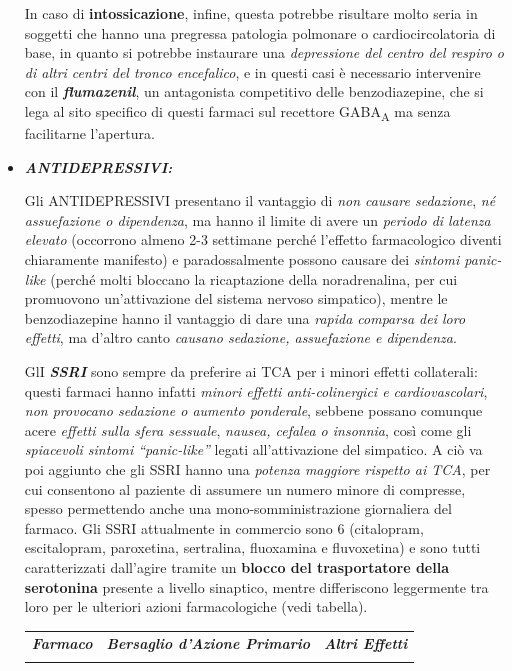 \begin{itemize}
In
caso di \textbf{intossicazione}, infine, questa potrebbe risultare molto
seria in soggetti che hanno una pregressa patologia polmonare o
cardiocircolatoria di base, in quanto si potrebbe instaurare una
\emph{depressione del centro del respiro o di altri centri del tronco
encefalico}, e in questi casi è necessario intervenire con il
\textbf{\emph{flumazenil}}, un antagonista competitivo delle
benzodiazepine, che si lega al sito specifico di questi farmaci sul
recettore GABA\textsubscript{A} ma senza facilitarne l'apertura.


\item
  \textbf{\emph{ANTIDEPRESSIVI:}}

Gli ANTIDEPRESSIVI presentano il vantaggio di \emph{non causare
sedazione}, \emph{né assuefazione o dipendenza}, ma hanno il limite di
avere un \emph{periodo di latenza elevato} (occorrono almeno 2-3
settimane perché l'effetto farmacologico diventi chiaramente manifesto)
e paradossalmente possono causare dei \emph{sintomi panic-like} (perché
molti bloccano la ricaptazione della noradrenalina, per cui promuovono
un'attivazione del sistema nervoso simpatico), mentre le benzodiazepine
hanno il vantaggio di dare una \emph{rapida comparsa dei loro effetti},
ma d'altro canto \emph{causano sedazione, assuefazione e dipendenza}.

GlI \emph{\textbf{SSRI}} sono sempre da preferire ai TCA per i minori
effetti collaterali: questi farmaci hanno infatti \emph{minori effetti
anti-colinergici e cardiovascolari}, \emph{non provocano sedazione o
aumento ponderale}, sebbene possano comunque acere \emph{effetti sulla
sfera sessuale}, \emph{nausea, cefalea o insonnia}, così come gli
\emph{spiacevoli sintomi ``panic-like''} legati all'attivazione del
simpatico. A ciò va poi aggiunto che gli SSRI hanno una \emph{potenza
maggiore rispetto ai TCA}, per cui consentono al paziente di assumere un
numero minore di compresse, spesso permettendo anche una
mono-somministrazione giornaliera del farmaco. Gli SSRI attualmente in
commercio sono 6 (citalopram, escitalopram, paroxetina, sertralina,
fluoxamina e fluvoxetina) e sono tutti caratterizzati dall'agire tramite
un \textbf{blocco del trasportatore della serotonina} presente a livello
sinaptico, mentre differiscono leggermente tra loro per le ulteriori
azioni farmacologiche (vedi tabella).

\begin{table}
\begin{tabular}{p{}p{}p{}}
\hline\noalign{\smallskip}
\textbf{\emph{Farmaco}} & \textbf{\emph{Bersaglio d'Azione Primario}} & \textbf{\emph{Altri Effetti}}  \\
\noalign{\smallskip}\svhline\noalign{\smallskip}


\end{tabular}
\end{table}
\end{itemize}
